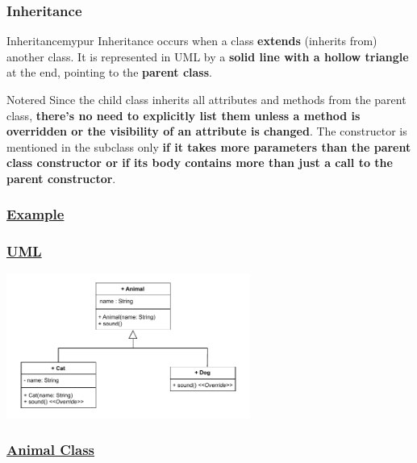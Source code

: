 \subsubsection*{Inheritance}

\begin{prettyBox}{Inheritance}{mypur}
Inheritance occurs when a class \textbf{extends} (inherits from) another class. It is represented in UML by a \textbf{solid line with a hollow triangle} at the end, pointing to the \textbf{parent class}.
\end{prettyBox}

\begin{prettyBox}{Note}{red}
Since the child class inherits all attributes and methods from the parent
class, \textbf{there's no need to explicitly list them unless a method is overridden
or the visibility of an attribute is changed}. The constructor is mentioned in
the subclass only\textbf{ if it takes more parameters than the parent class constructor or if its body contains more than just a call to the parent constructor}.
\end{prettyBox}

\subsubsection*{\underline{Example}}

\subsubsection*{\underline{UML}}

\begin{center}
\includegraphics[width=0.6\textwidth]{Chapters/Diagram/OOP/EX4/ex4.drawio.pdf}
\end{center}


\subsubsection*{\underline{Animal Class}}


